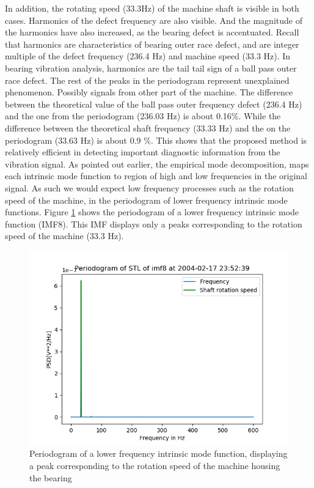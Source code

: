 \documentclass[../Main/thesis.tex]{subfiles}
\begin{document}
\justify
In addition, the rotating speed (33.3Hz) of the machine shaft is visible in both cases. Harmonics of the defect frequency are also visible. And the magnitude of the harmonics have also increased, as the bearing defect is accentuated. Recall that harmonics are characteristics of bearing outer race defect, and are integer multiple of the defect frequency (236.4 Hz) and machine speed (33.3 Hz). In bearing vibration analysis, harmonics are the tail tail sign of a ball pass outer race defect. The rest of the peaks in the periodogram represent unexplained phenomenon. Possibly signals from other part of the machine.
\justify
The difference between the theoretical value of the ball pass outer frequency defect (236.4 Hz) and the one from the periodogram (236.03 Hz) is about 0.16$\%$. While the difference between the theoretical shaft frequency (33.33 Hz) and the on the periodogram (33.63 Hz) is about 0.9 $\%$. This shows that the proposed method is relatively efficient in detecting important diagnostic information from the vibration signal. 
\justify
As pointed out earlier, the empirical mode decomposition, maps each intrinsic mode function to region of high and low frequencies in the original signal. As such we would expect low frequency processes such as the rotation speed of the machine, in the periodogram of lower frequency intrinsic mode functions. Figure \ref{fig:endimf8shaft} shows the periodogram of a lower frequency intrinsic mode function (IMF8). This IMF displays only a peaks corresponding to the rotation speed of the machine (33.3 Hz).
\begin{figure}[H]
	\centering
	\includegraphics[width=0.9\linewidth]{../fig/periodogram_bpfo/end_imf8_shaft}
	\caption{Periodogram of a lower frequency intrinsic mode function, displaying a peak corresponding to the rotation speed of the machine housing the bearing}
	\label{fig:endimf8shaft}
\end{figure}
\end{document}
